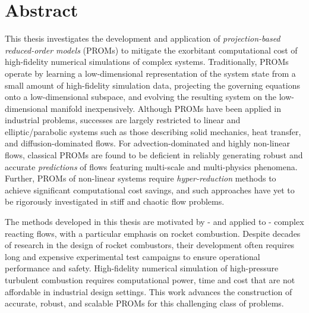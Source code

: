 \chapter{Abstract}


This thesis investigates the development and application of \textit{projection-based reduced-order models} (PROMs) to mitigate the exorbitant computational cost of high-fidelity numerical simulations of complex systems. Traditionally, PROMs operate by learning a low-dimensional representation of the system state from a small amount of high-fidelity simulation data, projecting the governing equations onto a low-dimensional subspace, and evolving the resulting system on the low-dimensional manifold inexpensively. Although PROMs have been applied in industrial problems, successes are largely restricted to linear and elliptic/parabolic systems such as those describing solid mechanics, heat transfer, and diffusion-dominated flows. For advection-dominated and highly non-linear flows, classical PROMs are found to be deficient in reliably generating robust and accurate {\em predictions} of flows featuring multi-scale and multi-physics phenomena. Further, PROMs of non-linear systems require \textit{hyper-reduction} methods to achieve significant computational cost savings, and such approaches have yet to be rigorously investigated in stiff and chaotic  flow problems.

The methods developed in this thesis are motivated by - and applied to - complex reacting flows, with a particular emphasis on rocket combustion.
Despite decades of research in the design of rocket combustors, their development often requires long and expensive experimental test campaigns to ensure operational performance and safety. High-fidelity numerical simulation of high-pressure turbulent combustion requires computational power, time and cost that are not affordable in industrial design settings. 
This  work advances the construction of accurate, robust, and scalable PROMs for this challenging class of problems.

